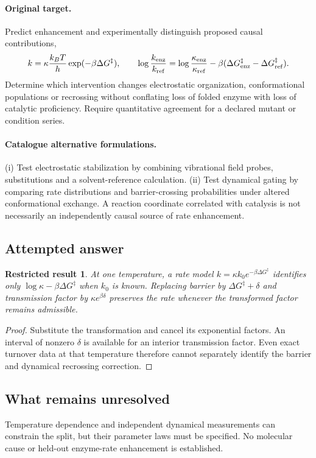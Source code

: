 \documentclass[11pt]{article}
\newtheorem{attemptresult}{Restricted result}[section]
\begin{document}
\paragraph{Original target.}
Predict enhancement and experimentally distinguish proposed causal contributions,
\[k=\kappa\frac{k_BT}{h}\exp(-\beta\Delta G^\ddagger),\qquad \log\frac{k_{\rm enz}}{k_{\rm ref}}=\log\frac{\kappa_{\rm enz}}{\kappa_{\rm ref}}-\beta(\Delta G^\ddagger_{\rm enz}-\Delta G^\ddagger_{\rm ref}).\]
Determine which intervention changes electrostatic organization, conformational populations or recrossing without conflating loss of folded enzyme with loss of catalytic proficiency. Require quantitative agreement for a declared mutant or condition series.
\paragraph{Catalogue alternative formulations.}
(i) Test electrostatic stabilization by combining vibrational field probes, substitutions and a solvent-reference calculation. (ii) Test dynamical gating by comparing rate distributions and barrier-crossing probabilities under altered conformational exchange. A reaction coordinate correlated with catalysis is not necessarily an independently causal source of rate enhancement.
\subsection{Attempted answer}
\begin{attemptresult}
At one temperature, a rate model $k=\kappa k_0e^{-\beta\Delta G^\ddagger}$ identifies only $\log\kappa-\beta\Delta G^\ddagger$ when $k_0$ is known. Replacing barrier by $\Delta G^\ddagger+\delta$ and transmission factor by $\kappa e^{\beta\delta}$ preserves the rate whenever the transformed factor remains admissible.
\end{attemptresult}
\begin{proof}
Substitute the transformation and cancel its exponential factors. An interval of nonzero $\delta$ is available for an interior transmission factor. Even exact turnover data at that temperature therefore cannot separately identify the barrier and dynamical recrossing correction.
\end{proof}
\subsection{What remains unresolved}
Temperature dependence and independent dynamical measurements can constrain the split, but their parameter laws must be specified. No molecular cause or held-out enzyme-rate enhancement is established.
\end{document}
